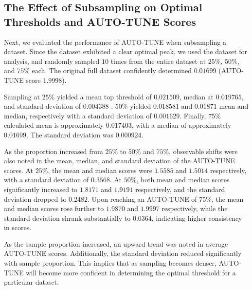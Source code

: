 \documentclass[utf8]{FrontiersinHarvard} %
\newcommand{\TODO}[1]{{\color{red}{#1}}}
\begin{document}
\TODO{Same here}

\subsection{The Effect of Subsampling on Optimal Thresholds and AUTO-TUNE Scores}

\TODO{Also should include some motivation}

Next, we evaluated the performance of AUTO-TUNE when subsampling a dataset.
Since the \cite{rhee_national_2019} dataset exhibited a clear optimal peak, we
used the dataset for analysis, and randomly sampled $10$ times from the entire
dataset at $25\%$, $50\%$, and $75\%$ each. The original full dataset
confidently determined $0.01699$ (AUTO-TUNE score $1.9998$). 

Sampling at $25\%$ yielded a mean top threshold of $0.021509$, median at
$0.019765$, and standard deviation of $0.004388$ \label{fig:subsampling}.
$50\%$ yielded $0.018581$ and $0.01871$ mean and median, respectively with a
standard deviation of $0.001629$. Finally, $75\%$ calculated mean is
approximately $0.017403$, with a median of approximately $0.01699$. The
standard deviation was $0.000924$.

\TODO{explain why the trend of HIGHER thresholds for the SPARSER sampling makes sense}

As the proportion increased from $25\%$ to $50\%$ and $75\%$, observable shifts
were also noted in the mean, median, and standard deviation of the AUTO-TUNE
scores. At $25\%$, the mean and median scores were $1.5585$ and $1.5014$
respectively, with a standard deviation of $0.3568$. At $50\%$, both mean and
median scores significantly increased to $1.8171$ and $1.9191$ respectively,
and the standard deviation dropped to $0.2482$. Upon reaching an AUTO-TUNE of
$75\%$, the mean and median scores rose further to $1.9870$ and $1.9997$
respectively, while the standard deviation shrank substantially to $0.0364$,
indicating higher consistency in scores.

As the sample proportion increased, an upward trend was noted in average
AUTO-TUNE scores. Additionally, the standard deviation reduced significantly with
sample proportion. This implies that as sampling becomes denser, AUTO-TUNE will
become more confident in determining the optimal threshold for a particular
dataset. 

\TODO{I still think that being able to show what fraction of the nodes connected in the full network are connected in the subsampled networks;
if you have network JSONs, I can check that pretty quickly}
\end{document}
